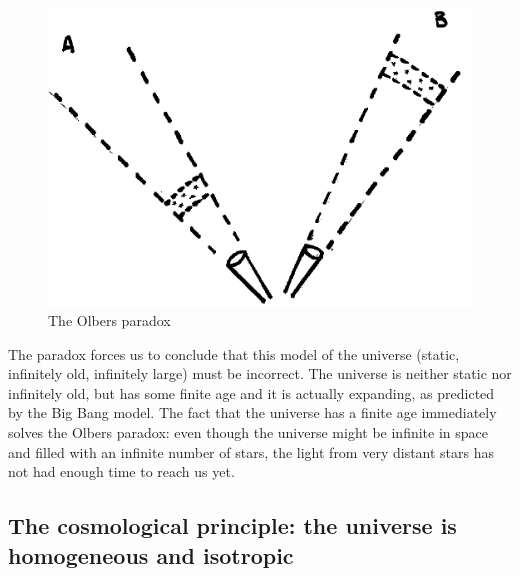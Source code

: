 \documentclass[11pt, a4paper,oneside,openright]{book}
\numberwithin{equation}{section}
\begin{document}
\begin{figure}[ht]
\begin{center}
\includegraphics[scale=0.5]{Draw/lec4_3.png}
\end{center}
\caption{The Olbers paradox}
\label{fig:lec4_3}
\end{figure}

The paradox forces us to conclude that this model of the universe (static, infinitely old, infinitely large) must be incorrect. The universe is neither static nor infinitely old, but has some finite age and it is actually expanding, as predicted by the Big Bang model. The fact that the universe has a finite age immediately solves the Olbers paradox: even though the universe might be infinite in space and filled with an infinite number of stars, the light from very distant stars has not had enough time to reach us yet.

\subsection{The cosmological principle: the universe is homogeneous and isotropic}
\end{document}
